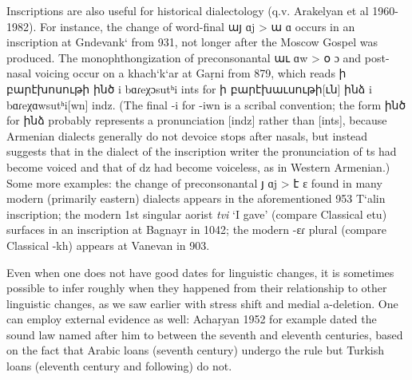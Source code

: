 \begin{exe}
Inscriptions are also useful for historical dialectology (q.v. Arakelyan et al 1960-1982). For instance, the change of word-final այ ɑj > ա ɑ occurs in an inscription at Gndevank‘ from 931, not longer after the Moscow Gospel was produced. The monophthongization of preconsonantal աւ ɑw > օ ɔ and post-nasal voicing occur on a khach‘k‘ar at Gaṛni from 879, which reads ի բարէխոսութի ինծ i bɑɾeχɔsutʰi ints for ի բարէխաւսութի[ւն] ինձ i bɑɾeχɑwsutʰi[wn] indz. (The final -i for -iwn is a scribal convention; the form ինծ for ինձ probably represents a pronunciation [indz] rather than [ints], because Armenian dialects generally do not devoice stops after nasals, but instead suggests that in the dialect of the inscription writer the pronunciation of ts had become voiced and that of dz had become voiceless, as in Western Armenian.) Some more examples: the change of preconsonantal յ ɑj > է ɛ found in many modern (primarily eastern) dialects appears in the aforementioned 953 T‘alin inscription; the modern 1st singular aorist \textit{tvi} ‘I gave’ (compare Classical etu) surfaces in an inscription at Bagnayr in 1042; the modern -ɛɾ plural (compare Classical -kh) appears at Vanevan in 903.

 

Even when one does not have good dates for linguistic changes, it is sometimes possible to infer roughly when they happened from their relationship to other linguistic changes, as we saw earlier with stress shift and medial a-deletion. One can employ external evidence as well: Achaṛyan 1952 for example dated the sound law named after him to between the seventh and eleventh centuries, based on the fact that Arabic loans (seventh century) undergo the rule but Turkish loans (eleventh century and following) do not.


\end{exe}
